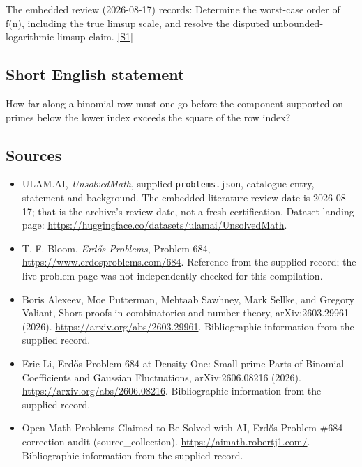 \documentclass[11pt,a4paper]{article}
\newcommand{\sref}[2]{\hyperlink{source:#1:#2}{[S#2]}}
\begin{document}
The embedded review (2026-08-17) records: Determine the worst-case order of f(n), including the true limsup scale, and resolve the disputed unbounded-logarithmic-limsup claim. \sref{statement}{1}

\subsection{Short English statement}

How far along a binomial row must one go before the component supported on primes below the lower index exceeds the square of the row index?

\subsection{Sources}

{\small

\begin{itemize}

\item[\hypertarget{source:statement:1}{S1}] ULAM.AI, \emph{UnsolvedMath}, supplied \texttt{problems.json}, catalogue entry, statement and background. The embedded literature-review date is 2026-08-17; that is the archive’s review date, not a fresh certification. Dataset landing page: \url{https://huggingface.co/datasets/ulamai/UnsolvedMath}.

\item[\hypertarget{source:statement:2}{S2}] T. F. Bloom, \emph{Erdős Problems}, Problem 684, \url{https://www.erdosproblems.com/684}. Reference from the supplied record; the live problem page was not independently checked for this compilation.

\item[\hypertarget{source:statement:3}{S3}] Boris Alexeev, Moe Putterman, Mehtaab Sawhney, Mark Sellke, and Gregory Valiant, Short proofs in combinatorics and number theory, arXiv:2603.29961 (2026). \url{https://arxiv.org/abs/2603.29961}. Bibliographic information from the supplied record.

\item[\hypertarget{source:statement:4}{S4}] Eric Li, Erdős Problem 684 at Density One: Small-prime Parts of Binomial Coefficients and Gaussian Fluctuations, arXiv:2606.08216 (2026). \url{https://arxiv.org/abs/2606.08216}. Bibliographic information from the supplied record.

\item[\hypertarget{source:statement:5}{S5}] Open Math Problems Claimed to Be Solved with AI, Erdős Problem \#684 correction audit (source\_collection). \url{https://aimath.robertj1.com/}. Bibliographic information from the supplied record.

\end{itemize}

}

\label{end:statement}
\end{document}

